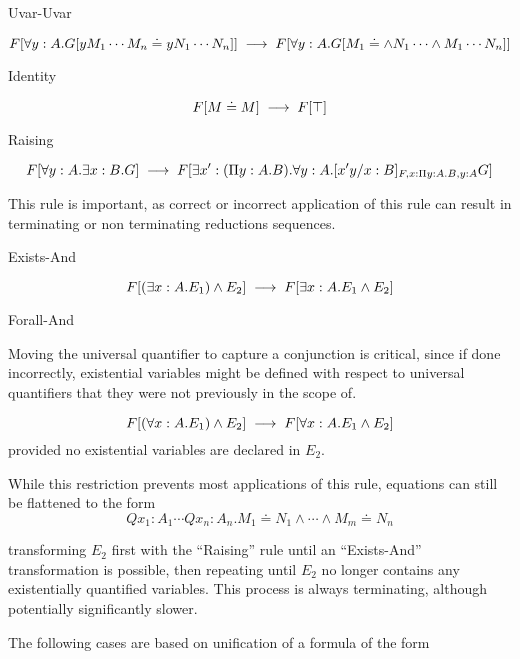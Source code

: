 \begin{tcase}
Uvar-Uvar
\end{tcase}

\[
F[\forall y : A . G[y M_1 \cdots M_n \doteq y N_1 \cdots N_n  ]]
\;\longrightarrow\;
F[\forall y : A . G[ M_1 \doteq \wedge N_1 \cdots \wedge M_1 \cdots N_n ]]
\]

\begin{tcase}
Identity
\end{tcase}

\[
F[M \doteq M] 
\;\longrightarrow\;
F[\top]
\]

\begin{tcase}
Raising
\end{tcase}

\[
F[\forall y : A . \exists x : B . G]
\;\longrightarrow\;
F[\exists x' : (\Pi y : A . B) . \forall y : A . [x' y / x : B]_{F, x : \Pi y : A . B , y : A} G]
\]

This rule is important, as correct or 
incorrect application of this rule can result in 
terminating or non terminating reductions sequences.

\begin{tcase}
Exists-And
\end{tcase}

\[
F[(\exists x : A . E_1) \wedge E_2]
\;\longrightarrow\;
F[\exists x : A . E_1 \wedge E_2]
\]

\begin{tcase}
Forall-And
\end{tcase}


Moving the universal quantifier to
capture a conjunction is critical, since
if done incorrectly, existential variables might be 
defined with respect to universal quantifiers that they
were not previously in the scope of.

\[
F[(\forall x : A . E_1) \wedge E_2]
\;\longrightarrow\;
F[\forall x : A . E_1 \wedge E_2]
\]
provided no existential variables are declared in $E_2$.

While this restriction prevents most applications of this rule, 
equations can still be flattened to the form
\[
Qx_1:A_1\cdots Qx_n : A_n . M_1 \doteq N_1 \wedge \cdots \wedge M_m \doteq N_n
\]

transforming $E_2$ first with the ``Raising'' rule until 
an ``Exists-And'' transformation is possible, then repeating  
until $E_2$ no longer contains any existentially 
quantified variables.  This process is always terminating,
although potentially significantly slower.

The following cases are based on unification 
of a formula of the form

